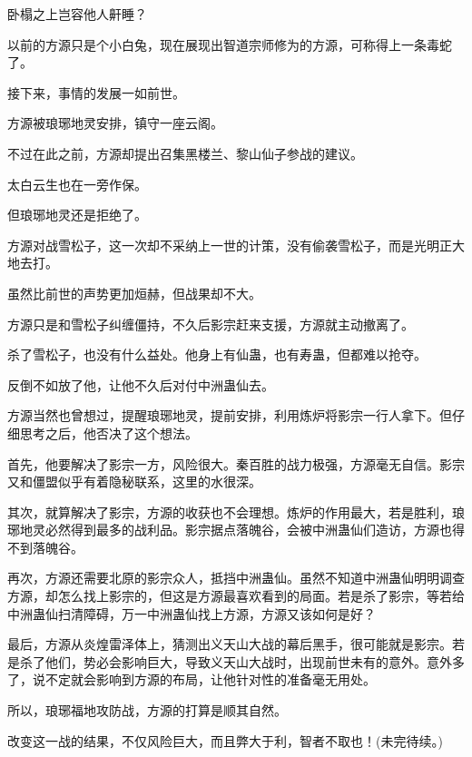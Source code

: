 \begin{this_body}
卧榻之上岂容他人鼾睡？

以前的方源只是个小白兔，现在展现出智道宗师修为的方源，可称得上一条毒蛇了。

接下来，事情的发展一如前世。

方源被琅琊地灵安排，镇守一座云阁。

不过在此之前，方源却提出召集黑楼兰、黎山仙子参战的建议。

太白云生也在一旁作保。

但琅琊地灵还是拒绝了。

方源对战雪松子，这一次却不采纳上一世的计策，没有偷袭雪松子，而是光明正大地去打。

虽然比前世的声势更加烜赫，但战果却不大。

方源只是和雪松子纠缠僵持，不久后影宗赶来支援，方源就主动撤离了。

杀了雪松子，也没有什么益处。他身上有仙蛊，也有寿蛊，但都难以抢夺。

反倒不如放了他，让他不久后对付中洲蛊仙去。

方源当然也曾想过，提醒琅琊地灵，提前安排，利用炼炉将影宗一行人拿下。但仔细思考之后，他否决了这个想法。

首先，他要解决了影宗一方，风险很大。秦百胜的战力极强，方源毫无自信。影宗又和僵盟似乎有着隐秘联系，这里的水很深。

其次，就算解决了影宗，方源的收获也不会理想。炼炉的作用最大，若是胜利，琅琊地灵必然得到最多的战利品。影宗据点落魄谷，会被中洲蛊仙们造访，方源也得不到落魄谷。

再次，方源还需要北原的影宗众人，抵挡中洲蛊仙。虽然不知道中洲蛊仙明明调查方源，却怎么找上影宗的，但这是方源最喜欢看到的局面。若是杀了影宗，等若给中洲蛊仙扫清障碍，万一中洲蛊仙找上方源，方源又该如何是好？

最后，方源从炎煌雷泽体上，猜测出义天山大战的幕后黑手，很可能就是影宗。若是杀了他们，势必会影响巨大，导致义天山大战时，出现前世未有的意外。意外多了，说不定就会影响到方源的布局，让他针对性的准备毫无用处。

所以，琅琊福地攻防战，方源的打算是顺其自然。

改变这一战的结果，不仅风险巨大，而且弊大于利，智者不取也！(未完待续。)

\end{this_body}

